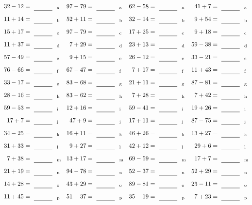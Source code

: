 \documentclass
[
  draft    = true,
  fontsize = 11pt,
  parskip  = half-
]
{scrartcl}
\begin{document}
\clearpage
\begin{align*}
    \pline{32-12}&=\rline{a}
  & \pline{97-79}&=\rline{a}
  & \pline{62-58}&=\rline{a}
  & \pline{41+7}&=\rline{a} \\[1ex]
    \pline{11+14}&=\rline{b}
  & \pline{52+11}&=\rline{b}
  & \pline{32-14}&=\rline{b}
  & \pline{9+54}&=\rline{b} \\[1ex]
    \pline{15+17}&=\rline{c}
  & \pline{97-79}&=\rline{c}
  & \pline{17+25}&=\rline{c}
  & \pline{9+18}&=\rline{c} \\[1ex]
    \pline{11+37}&=\rline{d}
  & \pline{7+29}&=\rline{d}
  & \pline{23+13}&=\rline{d}
  & \pline{59-38}&=\rline{d} \\[1ex]
    \pline{57-49}&=\rline{e}
  & \pline{9+15}&=\rline{e}
  & \pline{26-12}&=\rline{e}
  & \pline{33-21}&=\rline{e} \\[1ex]
    \pline{76-66}&=\rline{f}
  & \pline{67-47}&=\rline{f}
  & \pline{7+17}&=\rline{f}
  & \pline{11+43}&=\rline{f} \\[1ex]
    \pline{33-17}&=\rline{g}
  & \pline{83-68}&=\rline{g}
  & \pline{21+11}&=\rline{g}
  & \pline{87-81}&=\rline{g} \\[1ex]
    \pline{28-16}&=\rline{h}
  & \pline{83-62}&=\rline{h}
  & \pline{7+28}&=\rline{h}
  & \pline{7+42}&=\rline{h} \\[1ex]
    \pline{59-53}&=\rline{i}
  & \pline{12+16}&=\rline{i}
  & \pline{59-41}&=\rline{i}
  & \pline{19+26}&=\rline{i} \\[1ex]
    \pline{17+7}&=\rline{j}
  & \pline{47+9}&=\rline{j}
  & \pline{17+11}&=\rline{j}
  & \pline{87-75}&=\rline{j} \\[1ex]
    \pline{34-25}&=\rline{k}
  & \pline{16+11}&=\rline{k}
  & \pline{46+26}&=\rline{k}
  & \pline{13+27}&=\rline{k} \\[1ex]
    \pline{31+33}&=\rline{l}
  & \pline{9+27}&=\rline{l}
  & \pline{42+12}&=\rline{l}
  & \pline{29+6}&=\rline{l} \\[1ex]
    \pline{7+38}&=\rline{m}
  & \pline{13+17}&=\rline{m}
  & \pline{69-59}&=\rline{m}
  & \pline{17+7}&=\rline{m} \\[1ex]
    \pline{21+19}&=\rline{n}
  & \pline{94-78}&=\rline{n}
  & \pline{52-37}&=\rline{n}
  & \pline{52+29}&=\rline{n} \\[1ex]
    \pline{14+28}&=\rline{o}
  & \pline{43+29}&=\rline{o}
  & \pline{89-81}&=\rline{o}
  & \pline{23-11}&=\rline{o} \\[1ex]
    \pline{11+45}&=\rline{p}
  & \pline{51-37}&=\rline{p}
  & \pline{35-19}&=\rline{p}
  & \pline{7+23}&=\rline{p}
\end{align*}
\end{document}
